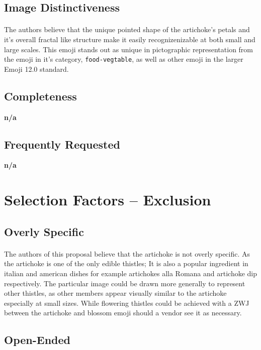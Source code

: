\documentclass[11pt, oneside,a4paper]{article}
\begin{document}
    \subsection{Image Distinctiveness}
        \paragraph{}
        The authors believe that the unique pointed shape of the artichoke's petals and it's overall fractal like structure make it easily recognizenizable at both small and large scales. This emoji stands out as unique in pictographic representation from the emoji in it's category, \texttt{food-vegtable}, as well as other emoji in the larger Emoji 12.0 standard.

    \subsection{Completeness}
      \textbf{n/a}
    \subsection{Frequently Requested}
      \textbf{n/a}

  \section{Selection Factors -- Exclusion}
    \subsection{Overly Specific}
        \paragraph{}
        The authors of this proposal believe that the artichoke is not overly specific. As the artichoke is one of the only edible thistles; It is also a popular ingredient in italian and american dishes for example artichokes alla Romana and artichoke dip respectively. The particular image could be drawn more generally to represent other thistles, as other members appear visually similar to the artichoke especially at small sizes. While flowering thistles could be achieved with a ZWJ between the artichoke and blossom emoji should a vendor see it as necessary.
    
    \subsection{Open-Ended}
\end{document}
